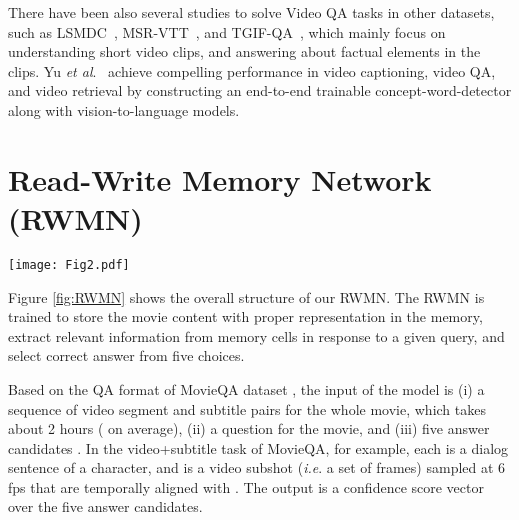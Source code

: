 \documentclass[10pt,twocolumn,letterpaper]{article}
\makeatletter
\theoremstyle{nonumberplain}
\DeclareRobustCommand\onedot{\futurelet\@let@token\@onedot}
\def\onedot{.\@\xspace}
\def\ie{\emph{i.e}\onedot} \def\Ie{\emph{I.e}\onedot}
\def\etal{\emph{et al}\onedot}
\makeatother
\begin{document}
There have been also several studies to solve Video QA tasks in other datasets, such as LSMDC~\cite{rohrbach2016movie}, MSR-VTT~\cite{xu2016msr}, and TGIF-QA~\cite{jang2017tgifqa}, which mainly focus on understanding short video clips, and answering about factual elements in the clips. Yu \etal~\cite{yu2017lsmdc} achieve compelling performance in video captioning, video QA, and video retrieval by constructing an end-to-end trainable concept-word-detector along with vision-to-language models.







\section{ Read-Write Memory Network (RWMN)}
\label{sec:rwmn}

\begin{figure*}
\begin{center}
    \texttt{[image: Fig2.pdf]}
\end{center}
   \caption{Illustration of the proposed \textit{Read-Write Network}. 
   (a) The multimodal movie embedding  is obtained using the ResNet feature and the Word2Vec representation from movie subshots and subscripts (section \ref{sec:movie_embedding}). 
   (b) The write memory  abstracts higher-level sequential information through multiple convolution layers (section \ref{sec:write_net}). 
   (c) The query-dependent memory  is obtained via the Compact Bilinear Pooling (CBP) between the query and each slot of , and then the read memory  is constructed through convolution layers (section \ref{sec:read_net}).
   (d) Finally, the answer with the highest confidence score is chosen out of five candidates (section \ref{sec:answer_selection}).
}
\label{fig:RWMN}
\end{figure*}


Figure \ref{fig:RWMN} shows the overall structure of our RWMN.
The RWMN is trained to store the movie content with proper representation in the memory, 
extract relevant information from memory cells in response to a given query, and select correct answer from five choices.

Based on the QA format of MovieQA dataset \cite{tapaswi2016movieqa}, the input of the model is (i) a sequence of video segment and subtitle pairs  for the whole movie, which takes about 2 hours ( on average), (ii) a question  for the movie, and (iii) five answer candidates .
In the video+subtitle task of MovieQA, for example, each  is a dialog sentence of a character, and  is a video subshot (\ie a set of frames)  sampled at 6 fps that are temporally aligned with . 
The output is a confidence score vector over the five answer candidates.
\end{document}
